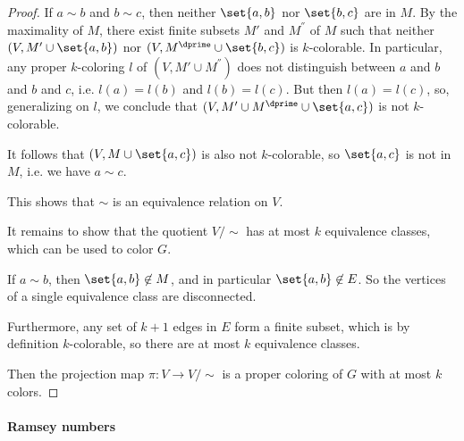 \begin{proof}
  If \( a \sim b \) and \( b \sim c \), then neither \( \set{ a, b } \) nor \( \set{ b, c } \) are in \( M \). By the maximality of \( M \), there exist finite subsets \( M' \) and \( M^\dprime \) of \( M \) such that neither \( (V, M' \cup \set{ a, b }) \) nor \( (V, M^\dprime \cup \set{ b, c }) \) is \( k \)-colorable. In particular, any proper \( k \)-coloring \( l \) of \( (V, M' \cup M^\dprime) \) does not distinguish between \( a \) and \( b \) and \( b \) and \( c \), i.e. \( l(a) = l(b) \) and \( l(b) = l(c) \). But then \( l(a) = l(c) \), so, generalizing on \( l \), we conclude that \( (V, M' \cup M^\dprime \cup \set{ a, c }) \) is not \( k \)-colorable.

  It follows that \( (V, M \cup \set{ a, c }) \) is also not \( k \)-colorable, so \( \set{ a, c } \) is not in \( M \), i.e. we have \( a \sim c \).

  This shows that \( {\sim} \) is an equivalence relation on \( V \).

   It remains to show that the quotient \( V / {\sim} \) has at most \( k \) equivalence classes, which can be used to color \( G \).

  If \( a \sim b \), then \( \set{ a, b } \not\in M \), and in particular \( \set{ a, b } \not\in E \). So the vertices of a single equivalence class are disconnected.

  Furthermore, any set of \( k + 1 \) edges in \( E \) form a finite subset, which is by definition \( k \)-colorable, so there are at most \( k \) equivalence classes.

  Then the projection map \( \pi: V \to V / {\sim} \) is a proper coloring of \( G \) with at most \( k \) colors.
\end{proof}

\paragraph{Ramsey numbers}

